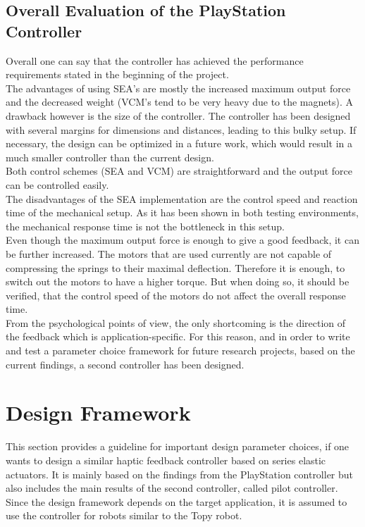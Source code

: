 \subsection{Overall Evaluation of the PlayStation Controller}
Overall one can say that the controller has achieved the performance requirements stated in the beginning of the project. \\ %
The advantages of using SEA's are mostly the increased maximum output force and the decreased weight (VCM's tend to be very heavy due to the magnets). A drawback however is the size of the controller. The controller has been designed with several margins for dimensions and distances, leading to this bulky setup. If necessary, the design can be optimized in a future work, which would result in a much smaller controller than the current design.\\
Both control schemes (SEA and VCM) are straightforward and the output force can be controlled easily.\\
The disadvantages of the SEA implementation are the control speed and reaction time of the mechanical setup. As it has been shown in both testing environments, the mechanical response time is not the bottleneck in this setup.\\
Even though the maximum output force is enough to give a good feedback, it can be further increased. The motors that are used currently are not capable of compressing the springs to their maximal deflection. Therefore it is enough, to switch out the motors to have a higher torque. But when doing so, it should be verified, that the control speed of the motors do not affect the overall response time.\\
From the psychological points of view, the only shortcoming is the direction of the feedback which is application-specific. For this reason, and in order to write and test a parameter choice framework for future research projects, based on the current findings, a second controller has been designed.\\


\section{Design Framework}
This section provides a guideline for important design parameter choices, if one wants to design a similar haptic feedback controller based on series elastic actuators. It is mainly based on the findings from the PlayStation controller but also includes the main results of the second controller, called pilot controller. \\
Since the design framework depends on the target application, it is assumed to use the controller for robots similar to the Topy robot.

